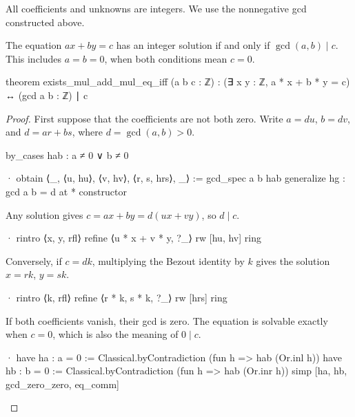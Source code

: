 All coefficients and unknowns are integers.
We use the nonnegative gcd constructed above.

\begin{theorem}
  \label{ent:thm:diophantine-solvability}
  The equation $ax+by=c$ has an integer solution if and only if $\gcd(a,b)\mid c$.
  This includes $a=b=0$, when both conditions mean $c=0$.

  \begin{lean}
    theorem exists_mul_add_mul_eq_iff (a b c : ℤ) :
        (∃ x y : ℤ, a * x + b * y = c) ↔ (gcd a b : ℤ) ∣ c
  \end{lean}
\end{theorem}

\begin{proof}
  First suppose that the coefficients are not both zero.
  Write $a=du$, $b=dv$, and $d=ar+bs$, where $d=\gcd(a,b)>0$.

  \begin{lean}
    by_cases hab : a ≠ 0 ∨ b ≠ 0

    · obtain ⟨_, ⟨u, hu⟩, ⟨v, hv⟩, ⟨r, s, hrs⟩, _⟩ := gcd_spec a b hab
      generalize hg : gcd a b = d at *
      constructor
  \end{lean}

  Any solution gives $c=ax+by=d(ux+vy)$, so $d\mid c$.

  \begin{lean}
    · rintro ⟨x, y, rfl⟩
      refine ⟨u * x + v * y, ?_⟩
      rw [hu, hv]
      ring
  \end{lean}

  Conversely, if $c=dk$, multiplying the Bezout identity by $k$ gives the solution $x=rk$, $y=sk$.

  \begin{lean}
    · rintro ⟨k, rfl⟩
      refine ⟨r * k, s * k, ?_⟩
      rw [hrs]
      ring
  \end{lean}

  If both coefficients vanish, their gcd is zero.
  The equation is solvable exactly when $c=0$, which is also the meaning of $0\mid c$.

  \begin{lean}
    · have ha : a = 0 := Classical.byContradiction (fun h => hab (Or.inl h))
      have hb : b = 0 := Classical.byContradiction (fun h => hab (Or.inr h))
      simp [ha, hb, gcd_zero_zero, eq_comm]
  \end{lean}

\end{proof}


